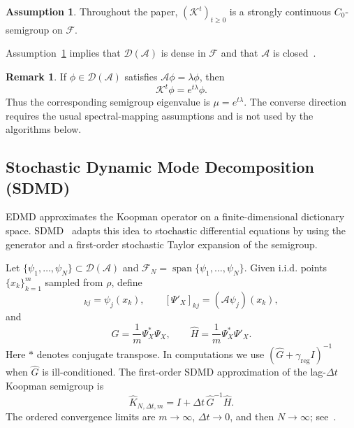 \documentclass{article}
\numberwithin{equation}{section}
\theoremstyle{definition}
\newtheorem{assumption}[theorem]{Assumption}
\newtheorem{remark}[theorem]{Remark}
\begin{document}
\begin{assumption}\label{ass:str_cont_semigroup_K}
Throughout the paper, $(\mathcal{K}^t)_{t\ge0}$ is a strongly continuous $C_0$-semigroup on $\mathcal{F}$.
\end{assumption}

Assumption~\ref{ass:str_cont_semigroup_K} implies that $\mathcal{D}(\mathcal{A})$ is dense in $\mathcal{F}$ and that $\mathcal{A}$ is closed~\cite{pazy2012semigroups}.

\begin{remark}\label{rem:spectral_mapping_eigenfunctions}
If $\phi\in\mathcal{D}(\mathcal{A})$ satisfies $\mathcal{A}\phi=\lambda\phi$, then
\begin{equation*}
    \mathcal{K}^t\phi=e^{t\lambda}\phi.
\end{equation*}
Thus the corresponding semigroup eigenvalue is $\mu=e^{t\lambda}$. The converse direction requires the usual spectral-mapping assumptions and is not used by the algorithms below.
\end{remark}

\subsection{Stochastic Dynamic Mode Decomposition (SDMD)}
EDMD approximates the Koopman operator on a finite-dimensional dictionary space. SDMD~\cite{xu2025datadrivenframeworkkoopmansemigroup} adapts this idea to stochastic differential equations by using the generator and a first-order stochastic Taylor expansion of the semigroup.

Let $\{\psi_1,\ldots,\psi_N\}\subset\mathcal{D}(\mathcal{A})$ and $\mathcal{F}_N=\operatorname{span}\{\psi_1,\ldots,\psi_N\}$. Given i.i.d. points $\{x_k\}_{k=1}^m$ sampled from $\rho$, define
\begin{equation*}
    [\Psi_X]_{kj}=\psi_j(x_k),
    \qquad
    [\Psi'_X]_{kj}=(\mathcal{A}\psi_j)(x_k),
\end{equation*}
and
\begin{equation*}
    \widehat G=\frac1m\Psi_X^*\Psi_X,
    \qquad
    \widehat H=\frac1m\Psi_X^*\Psi'_X.
\end{equation*}
Here $*$ denotes conjugate transpose. In computations we use $(\widehat G+\gamma_{\mathrm{reg}}I)^{-1}$ when $\widehat G$ is ill-conditioned. The first-order SDMD approximation of the lag-$\Delta t$ Koopman semigroup is
\begin{equation*}
    \widehat K_{N,\Delta t,m}=I+\Delta t\,\widehat G^{-1}\widehat H.
\end{equation*}
The ordered convergence limits are $m\to\infty$, $\Delta t\to0$, and then $N\to\infty$; see~\cite[Section~4]{xu2025datadrivenframeworkkoopmansemigroup}.
\end{document}

